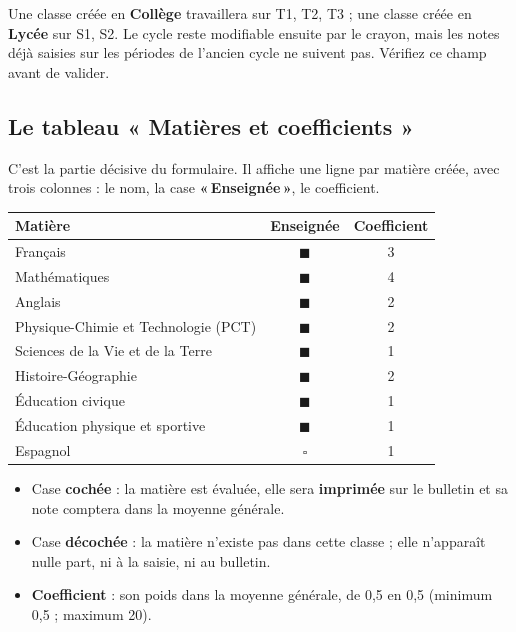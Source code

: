 \documentclass[11pt,a4paper]{article}
\newcommand{\menu}[1]{\textbf{«\,#1\,»}}
\begin{document}
\begin{boiteattention}
Une classe créée en \textbf{Collège} travaillera sur T1, T2, T3 ; une classe créée
en \textbf{Lycée} sur S1, S2. Le cycle reste modifiable ensuite par le crayon,
mais les notes déjà saisies sur les périodes de l'ancien cycle ne suivent pas.
Vérifiez ce champ avant de valider.
\end{boiteattention}

\subsection{Le tableau « Matières et coefficients »}

C'est la partie décisive du formulaire. Il affiche une ligne par matière créée,
avec trois colonnes : le nom, la case \menu{Enseignée}, le coefficient.

\begin{center}
\renewcommand{\arraystretch}{1.3}
\begin{tabular}{@{}lcc@{}}
\toprule
\textbf{Matière} & \textbf{Enseignée} & \textbf{Coefficient} \\
\midrule
Français & $\blacksquare$ & 3 \\
Mathématiques & $\blacksquare$ & 4 \\
Anglais & $\blacksquare$ & 2 \\
Physique-Chimie et Technologie (PCT) & $\blacksquare$ & 2 \\
Sciences de la Vie et de la Terre & $\blacksquare$ & 1 \\
Histoire-Géographie & $\blacksquare$ & 2 \\
Éducation civique & $\blacksquare$ & 1 \\
Éducation physique et sportive & $\blacksquare$ & 1 \\
Espagnol & $\square$ & 1 \\
\bottomrule
\end{tabular}
\end{center}

\begin{itemize}
  \item Case \textbf{cochée} : la matière est évaluée, elle sera \textbf{imprimée}
        sur le bulletin et sa note comptera dans la moyenne générale.
  \item Case \textbf{décochée} : la matière n'existe pas dans cette classe ;
        elle n'apparaît nulle part, ni à la saisie, ni au bulletin.
  \item \textbf{Coefficient} : son poids dans la moyenne générale, de 0,5 en 0,5
        (minimum 0,5 ; maximum 20).
\end{itemize}
\end{document}
